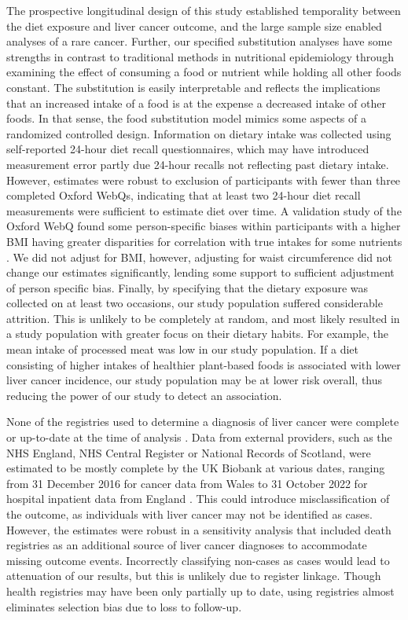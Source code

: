 \documentclass[nutrients,article,submit,moreauthors,pdftex]{Definitions/mdpi}
\begin{document}
The prospective longitudinal design of this study established
temporality between the diet exposure and liver cancer outcome, and the
large sample size enabled analyses of a rare cancer. Further, our
specified substitution analyses have some strengths in contrast to
traditional methods in nutritional epidemiology through examining the
effect of consuming a food or nutrient while holding all other foods
constant. The substitution is easily interpretable and reflects the
implications that an increased intake of a food is at the expense a
decreased intake of other foods. In that sense, the food substitution
model mimics some aspects of a randomized controlled design. Information
on dietary intake was collected using self-reported 24-hour diet recall
questionnaires, which may have introduced measurement error partly due
24-hour recalls not reflecting past dietary intake. However, estimates
were robust to exclusion of participants with fewer than three completed
Oxford WebQs, indicating that at least two 24-hour diet recall
measurements were sufficient to estimate diet over time. A validation
study of the Oxford WebQ found some person-specific biases within
participants with a higher BMI having greater disparities for
correlation with true intakes for some nutrients \citep{Greenwood2019}.
We did not adjust for BMI, however, adjusting for waist circumference
did not change our estimates significantly, lending some support to
sufficient adjustment of person specific bias. Finally, by specifying
that the dietary exposure was collected on at least two occasions, our
study population suffered considerable attrition. This is unlikely to be
completely at random, and most likely resulted in a study population
with greater focus on their dietary habits. For example, the mean intake
of processed meat was low in our study population. If a diet consisting
of higher intakes of healthier plant-based foods is associated with
lower liver cancer incidence, our study population may be at lower risk
overall, thus reducing the power of our study to detect an association.

None of the registries used to determine a diagnosis of liver cancer
were complete or up-to-date at the time of analysis \citep{RN112}. Data
from external providers, such as the NHS England, NHS Central Register
or National Records of Scotland, were estimated to be mostly complete by
the UK Biobank at various dates, ranging from 31 December 2016 for
cancer data from Wales to 31 October 2022 for hospital inpatient data
from England \citep{RN114}. This could introduce misclassification of
the outcome, as individuals with liver cancer may not be identified as
cases. However, the estimates were robust in a sensitivity analysis that
included death registries as an additional source of liver cancer
diagnoses to accommodate missing outcome events. Incorrectly classifying
non-cases as cases would lead to attenuation of our results, but this is
unlikely due to register linkage. Though health registries may have been
only partially up to date, using registries almost eliminates selection
bias due to loss to follow-up.
\end{document}
